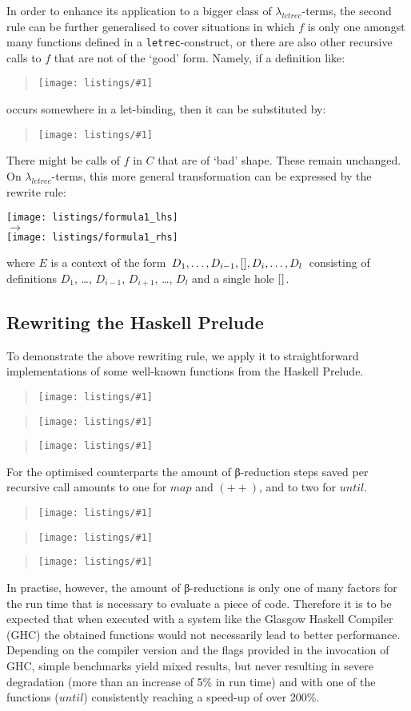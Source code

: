 \documentclass[submission,copyright,creativecommons]{eptcs}
\newcommand{\lambdaletrec}{\ensuremath{\lambda_\textit{letrec}}}
\newcommand{\letrec}{\texttt{letrec}}
\newcommand\listing[1]{\begin{quotation}\noindent\texttt{[image: listings/\#1]}\end{quotation}}
\newcommand\haskell[1]{\ensuremath{\mathit{#1}}}
\newcommand{\cxthole}{[\hspace*{0.5pt}]}
\newcommand{\sred}{\rightarrow}
\newcommand{\nbd}{\nobreakdash}
\renewcommand\;{\,}
\begin{document}
In order to enhance its application to a bigger class of \lambdaletrec\nbd-terms,
the second rule can be further generalised
to cover situations in which $f$ is only one amongst many functions defined in
a \letrec\nbd-construct, or there
are also other recursive calls to $f$ that are not of the `good' form. 
Namely, if a definition like: \listing{formula_lhs} occurs somewhere in a
let-binding, then it can be substituted by: \listing{formula_rhs}
There might be calls of $f$ in $C$ that are of `bad' shape. These remain unchanged. 
On $\lambdaletrec$\nbd-terms, this more general transformation can be expressed by the rewrite rule:
\begin{flushleft}
\vspace*{-0.5ex}
  \hspace*{6ex}\texttt{[image: listings/formula1\_lhs]}
  \\[-0.5ex]
  \hspace*{9ex}$\sred$
  \\[0.5ex]
  \hspace*{6ex}\texttt{[image: listings/formula1\_rhs]}
\end{flushleft}
where $E$ is a context of the form $\, D_1, \ldots, D_{i-1}, \cxthole, D_{i}, \ldots, D_l \,$
consisting of definitions $D_{1}$, \ldots, $D_{i-1}$, $D_{i+1}$, \ldots, $D_l$ and a single hole $\cxthole$. 












\subsection{Rewriting the Haskell Prelude}


To demonstrate the above rewriting rule, we apply it to straightforward
implementations of some well-known functions from the Haskell Prelude.

\listing{map}
\listing{until}
\listing{append}

For the optimised counterparts the amount of β-reduction steps saved per
recursive call amounts to one for \haskell{map} and \haskell{(++)}, and to two
for \haskell{until}.

\listing{map_eff}
\listing{until_eff}
\listing{append_eff}

In practise, however, the amount of β\nbd-reductions is only one of many
factors for the run time that is necessary to evaluate a piece of code.
Therefore it is to be expected that when executed with a system like the
Glasgow Haskell Compiler (GHC) the obtained functions would not necessarily
lead to better performance. Depending on the compiler version and the flags
provided in the invocation of GHC, simple benchmarks yield mixed results, but
never resulting in severe degradation (more than an increase of 5\% in run
time) and with one of the functions (\haskell{until}) consistently reaching a
speed-up of over 200\%.
\end{document}
